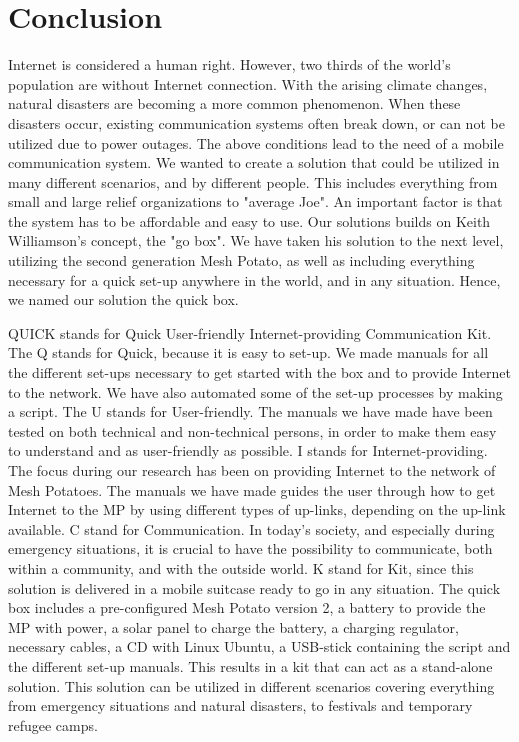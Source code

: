 \chapter{Conclusion}
\label{chp:conclusion} 

Internet is considered a human right. However, two thirds of the world's population are without Internet connection. With the arising climate changes, natural disasters are becoming a more common phenomenon. When these disasters occur, existing communication systems often break down, or can not be utilized due to power outages. The above conditions lead to the need of a mobile communication system. We wanted to create a solution that could be utilized in many different scenarios, and by different people. This includes everything from small and large relief organizations to "average Joe". An important factor is that the system has to be affordable and easy to use. Our solutions builds on Keith Williamson's concept, the "go box". We have taken his solution to the next level, utilizing the second generation Mesh Potato, as well as including everything necessary for a quick set-up anywhere in the world, and in any situation. Hence, we named our solution the \gls{quick} box. 

QUICK stands for Quick User-friendly Internet-providing Communication Kit. The Q stands for Quick, because it is easy to set-up. We made manuals for all the different set-ups necessary to get started with the box and to provide Internet to the network. We have also automated some of the set-up processes by making a script. The U stands for User-friendly. The manuals we have made have been tested on both technical and non-technical persons, in order to make them easy to understand and as user-friendly as possible. I stands for Internet-providing. The focus during our research has been on providing Internet to the network of Mesh Potatoes. The manuals we have made guides the user through how to get Internet to the MP by using different types of up-links, depending on the up-link available. C stand for Communication. In today's society, and especially during emergency situations, it is crucial to have the possibility to communicate, both within a community, and with the outside world. K stand for Kit, since this solution is delivered in a mobile suitcase ready to go in any situation. The \gls{quick} box includes a pre-configured Mesh Potato version 2, a battery to provide the MP with power, a solar panel to charge the battery, a charging regulator, necessary cables, a CD with Linux Ubuntu, a USB-stick containing the script and the different set-up manuals. 
This results in a kit that can act as a stand-alone solution. This solution can be utilized in different scenarios covering everything from emergency situations and natural disasters, to festivals and temporary refugee camps.

